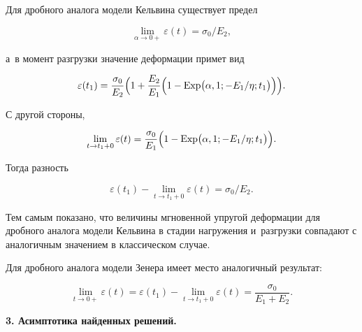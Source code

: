 Для дробного аналога модели Кельвина существует предел 

$$\lim_{\alpha\to0+}\varepsilon(t)=\sigma_{0}/E_{2},$$ 

а~в момент разгрузки значение деформации примет вид

\begin{equation*}

\varepsilon(t_{1})=\frac{\sigma_{0}}{E_{2}}\Bigl(

1+\frac{E_{2}}{E_{1}}\Bigl(1-  \mathop{\rm Exp}\nolimits  \bigl(\alpha, 1;-{E_{1}}/{\eta};t_{1}\bigr)\Bigr)

\Bigr).

\end{equation*}

С другой стороны,

\begin{equation*}

\lim_{t\to t_{1}+0}\varepsilon(t)=\frac{\sigma_{0}}{E_{1}}

\Bigl(1-  \mathop{\rm Exp}\nolimits  \bigl(\alpha, 1;-{E_{1}}/{\eta};t_{1}\bigr)\Bigr).

\end{equation*}

Тогда разность

\begin{equation*}

\varepsilon(t_{1})-\lim_{t\to t_{1}+0}\varepsilon(t)={\sigma_{0}}/{E_{2}}.

\end{equation*}

Тем самым показано, что величины мгновенной упругой деформации для дробного аналога модели Кельвина в стадии нагружения и~разгрузки совпадают с аналогичным значением в классическом случае.



Для дробного аналога модели Зенера имеет место аналогичный результат:

\begin{equation*}

\lim_{t\to 0+}\varepsilon(t)=\varepsilon(t_{1})-\lim_{t\to t_{1}+0}\varepsilon(t)=\frac{\sigma_{0}}{E_{1}+E_{2}}.

\end{equation*}



\smallskip





\textbf{ 3. Асимптотика найденных решений.}

